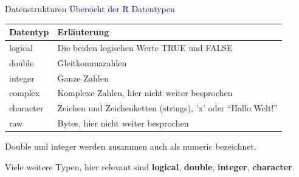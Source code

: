 \documentclass[
  8pt,
  ignorenonframetext,
]{beamer}
\begin{document}
\begin{frame}{Datenstrukturen}
\protect\hypertarget{datenstrukturen-4}{}
\textcolor{darkblue}{Übersicht der R Datentypen} \small {}
\vspace{5mm}

\begin{center}
\begin{tabular}{l|l}
Datentyp
& Erläuterung
\\\hline
logical
& Die beiden logischen Werte TRUE und FALSE
\\
double
&
Gleitkommazahlen
\\
integer
& Ganze Zahlen
\\
complex
& Komplexe Zahlen, hier nicht weiter besprochen
\\
character
& Zeichen und Zeichenketten (strings), 'x' oder ``Hallo Welt!''
\\
raw
& Bytes, hier nicht weiter besprochen
\\
\end{tabular}
\end{center}
\vspace{2mm}

Double und integer werden zusammen auch als numeric bezeichnet.

Viele weitere Typen, hier relevant sind \textbf{logical},
\textbf{double}, \textbf{integer}, \textbf{character}.
\end{frame}
\end{document}
